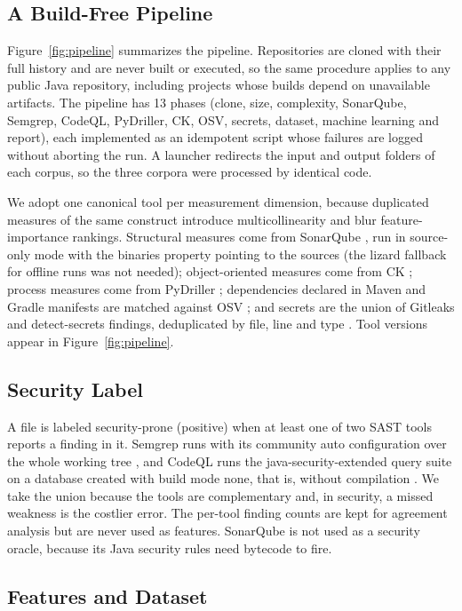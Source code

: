 \documentclass[a4paper,twoside]{article}
\begin{document}
\subsection{A Build-Free Pipeline}

Figure~\ref{fig:pipeline} summarizes the pipeline. Repositories are cloned with their full history and are never built or executed, so the same procedure applies to any public Java repository, including projects whose builds depend on unavailable artifacts. The pipeline has 13 phases (clone, size, complexity, SonarQube, Semgrep, CodeQL, PyDriller, CK, OSV, secrets, dataset, machine learning and report), each implemented as an idempotent script whose failures are logged without aborting the run. A launcher redirects the input and output folders of each corpus, so the three corpora were processed by identical code.

We adopt one canonical tool per measurement dimension, because duplicated measures of the same construct introduce multicollinearity and blur feature-importance rankings. Structural measures come from SonarQube \cite{sonarqube}, run in source-only mode with the binaries property pointing to the sources (the lizard fallback for offline runs was not needed); object-oriented measures come from CK \cite{ck}; process measures come from PyDriller \cite{spadini2018}; dependencies declared in Maven and Gradle manifests are matched against OSV \cite{osv}; and secrets are the union of Gitleaks and detect-secrets findings, deduplicated by file, line and type \cite{gitleaks,detectsecrets}. Tool versions appear in Figure~\ref{fig:pipeline}.

\subsection{Security Label}

A file is labeled security-prone (positive) when at least one of two SAST tools reports a finding in it. Semgrep runs with its community auto configuration over the whole working tree \cite{semgrep}, and CodeQL runs the java-security-extended query suite on a database created with build mode none, that is, without compilation \cite{codeql}. We take the union because the tools are complementary and, in security, a missed weakness is the costlier error. The per-tool finding counts are kept for agreement analysis but are never used as features. SonarQube is not used as a security oracle, because its Java security rules need bytecode to fire.

\subsection{Features and Dataset}
\end{document}
